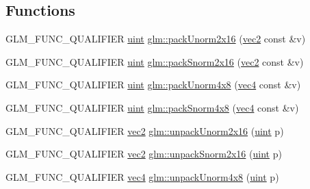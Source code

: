 \subsection*{Functions}
\begin{DoxyCompactItemize}
\item 
G\+L\+M\+\_\+\+F\+U\+N\+C\+\_\+\+Q\+U\+A\+L\+I\+F\+I\+ER \hyperlink{group__core__precision_ga4fd29415871152bfb5abd588334147c8}{uint} \hyperlink{group__core__func__packing_ga0e2d107039fe608a209497af867b85fb}{glm\+::pack\+Unorm2x16} (\hyperlink{group__core__types_gaa1618f51db67eaa145db101d8c8431d8}{vec2} const \&v)
\item 
G\+L\+M\+\_\+\+F\+U\+N\+C\+\_\+\+Q\+U\+A\+L\+I\+F\+I\+ER \hyperlink{group__core__precision_ga4fd29415871152bfb5abd588334147c8}{uint} \hyperlink{group__core__func__packing_ga977ab172da5494e5ac63e952afacfbe2}{glm\+::pack\+Snorm2x16} (\hyperlink{group__core__types_gaa1618f51db67eaa145db101d8c8431d8}{vec2} const \&v)
\item 
G\+L\+M\+\_\+\+F\+U\+N\+C\+\_\+\+Q\+U\+A\+L\+I\+F\+I\+ER \hyperlink{group__core__precision_ga4fd29415871152bfb5abd588334147c8}{uint} \hyperlink{group__core__func__packing_gaf7d2f7341a9eeb4a436929d6f9ad08f2}{glm\+::pack\+Unorm4x8} (\hyperlink{group__core__types_ga5881b1b022d7fd1b7218f5916532dd02}{vec4} const \&v)
\item 
G\+L\+M\+\_\+\+F\+U\+N\+C\+\_\+\+Q\+U\+A\+L\+I\+F\+I\+ER \hyperlink{group__core__precision_ga4fd29415871152bfb5abd588334147c8}{uint} \hyperlink{group__core__func__packing_ga85e8f17627516445026ab7a9c2e3531a}{glm\+::pack\+Snorm4x8} (\hyperlink{group__core__types_ga5881b1b022d7fd1b7218f5916532dd02}{vec4} const \&v)
\item 
G\+L\+M\+\_\+\+F\+U\+N\+C\+\_\+\+Q\+U\+A\+L\+I\+F\+I\+ER \hyperlink{group__core__types_gaa1618f51db67eaa145db101d8c8431d8}{vec2} \hyperlink{group__core__func__packing_ga1f66188e5d65afeb9ffba1ad971e4007}{glm\+::unpack\+Unorm2x16} (\hyperlink{group__core__precision_ga4fd29415871152bfb5abd588334147c8}{uint} p)
\item 
G\+L\+M\+\_\+\+F\+U\+N\+C\+\_\+\+Q\+U\+A\+L\+I\+F\+I\+ER \hyperlink{group__core__types_gaa1618f51db67eaa145db101d8c8431d8}{vec2} \hyperlink{group__core__func__packing_gacd8f8971a3fe28418be0d0fa1f786b38}{glm\+::unpack\+Snorm2x16} (\hyperlink{group__core__precision_ga4fd29415871152bfb5abd588334147c8}{uint} p)
\item 
G\+L\+M\+\_\+\+F\+U\+N\+C\+\_\+\+Q\+U\+A\+L\+I\+F\+I\+ER \hyperlink{group__core__types_ga5881b1b022d7fd1b7218f5916532dd02}{vec4} \hyperlink{group__core__func__packing_ga7f903259150b67e9466f5f8edffcd197}{glm\+::unpack\+Unorm4x8} (\hyperlink{group__core__precision_ga4fd29415871152bfb5abd588334147c8}{uint} p)

\end{DoxyCompactItemize}
